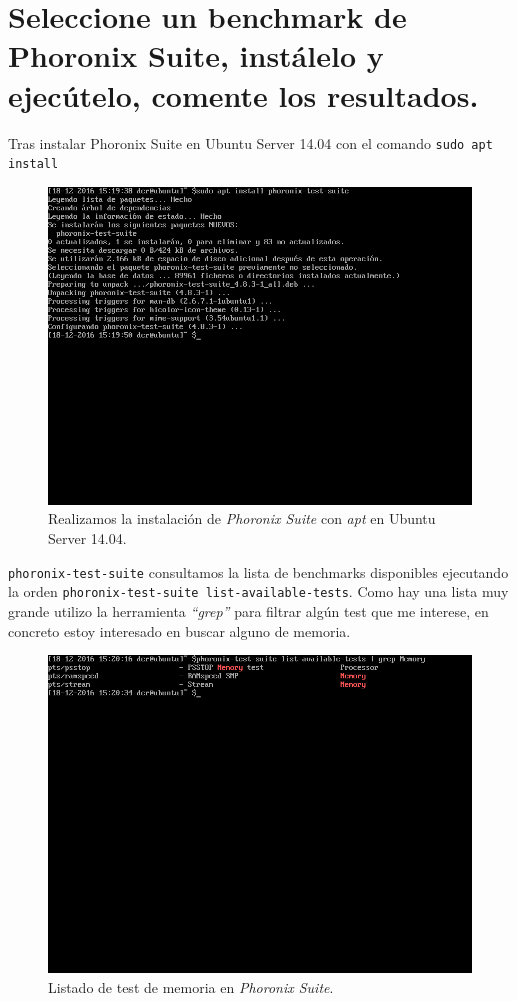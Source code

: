\section{Seleccione un benchmark de Phoronix Suite, instálelo y ejecútelo, comente los resultados.}
Tras instalar Phoronix Suite en Ubuntu Server 14.04 con el comando \verb|sudo apt install| \linebreak
\begin{figure}[H]
	\centering
	\includegraphics[scale=0.4]{phoronixInstall.png}
	\caption{Realizamos la instalación de \textit{Phoronix Suite} con \textit{apt} en Ubuntu Server 14.04.}
\end{figure}
 \verb|phoronix-test-suite| consultamos la lista de benchmarks disponibles ejecutando la orden \verb|phoronix-test-suite list-available-tests|. Como hay una lista muy grande utilizo la herramienta \textit{``grep''} para filtrar algún test que me interese, en concreto estoy interesado en buscar alguno de memoria.

\begin{figure}[H]
	\centering
	\includegraphics[scale=0.4]{phoronixMemory.png}
	\caption{Listado de test de memoria en \textit{Phoronix Suite}.}
\end{figure}

